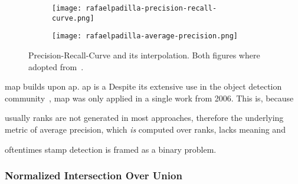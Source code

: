 \begin{figure}[htp!]
    \begin{subfigure}[t]{.49\linewidth}
        \centering
        \texttt{[image: rafaelpadilla-precision-recall-curve.png]}
    \end{subfigure}
    \hfill
    \begin{subfigure}[t]{.49\linewidth}
        \centering
        \texttt{[image: rafaelpadilla-average-precision.png]}
    \end{subfigure}
    \caption[Precision-Recall-Curve]{Precision-Recall-Curve and its
    interpolation. Both figures where adopted from~\cite{Padilla.2019}.}\label{fig:precision-recall-curve}
\end{figure}

\Gls{map} builds upon \gls{ap}. \Gls{ap} is a 
Despite its extensive use in the object detection community~\cite{Liu.2016,Ren.2015}, 
\Gls{map} was only applied in a single work \cite{Zhu.2006} from 2006. This is,
because 
\begin{enumerate*}[i.)]
    \item usually ranks are not generated in most approaches, therefore the 
    underlying metric of average precision, which \textit{is} computed over ranks, 
    lacks meaning and
    \item oftentimes stamp detection is framed as a binary problem.
\end{enumerate*} 

\subsubsection{Normalized Intersection Over Union}\label{subsect:normalized-iou}
\blindtext[1]

